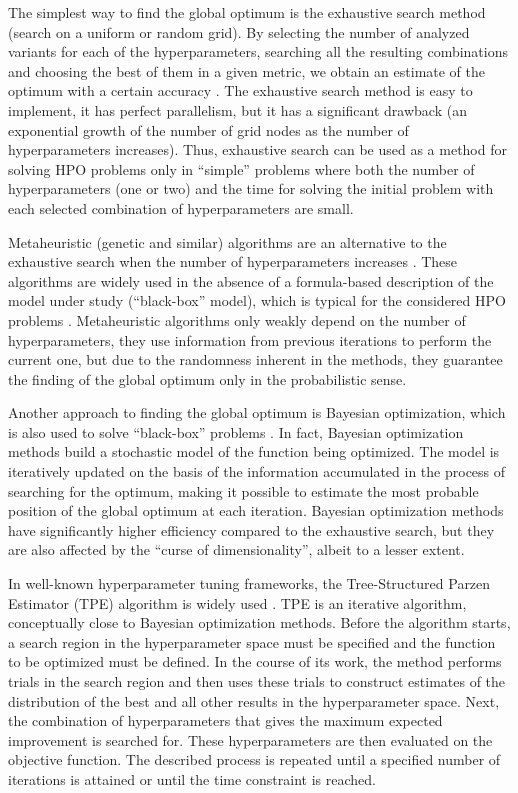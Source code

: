 \documentclass[iicol]{sn-jnl}
\theoremstyle{thmstyleone}%
\theoremstyle{thmstyletwo}%
\theoremstyle{thmstylethree}%
\begin{document}
The simplest way to find the global optimum is the exhaustive search method (search on a uniform \citep{Bao2006} or random \citep{Bergstra2012} grid). 
By selecting the number of analyzed variants for each of the hyperparameters, searching all the resulting combinations and choosing the best of them in a given metric, we obtain an estimate of the optimum with a certain accuracy \citep{Nevendra2022}. The exhaustive search method is easy to implement, it has perfect parallelism, but it has a significant drawback (an exponential growth of the number of grid nodes as the number of hyperparameters increases). Thus, exhaustive search can be used as a method for solving HPO problems only in ``simple'' problems where both the number of hyperparameters (one or two) and the time for solving the initial problem with each selected combination of hyperparameters are small. 

Metaheuristic (genetic and similar) algorithms are an alternative to the exhaustive search when the number of hyperparameters increases \citep{Opara2019}. These algorithms are widely used in the absence of a formula-based description of the model under study (``black-box'' model), which is typical for the considered HPO problems \citep{Zhou2021,Yang2022}. Metaheuristic algorithms only weakly depend on the number of hyperparameters, they use information from previous iterations to perform the current one, but due to the randomness inherent in the methods, they guarantee the finding of the global optimum only in the probabilistic sense.

Another approach to finding the global optimum is Bayesian optimization, which is also used to solve ``black-box'' problems \citep{Frazier2018,Archetti2019}. In fact, Bayesian optimization methods build a stochastic model of the function being optimized. The model is iteratively updated on the basis of the information accumulated in the process of searching for the optimum, making it possible to estimate the most probable position of the global optimum at each iteration. Bayesian optimization methods have significantly higher efficiency compared to the exhaustive search, but they are also affected by the ``curse of dimensionality'', albeit to a lesser extent. 

In well-known hyperparameter tuning frameworks, the Tree-Structured Parzen Estimator (TPE) algorithm is widely used \citep{hyperopt,NIPS2011}. TPE is an iterative algorithm, conceptually close to Bayesian optimization methods. Before the algorithm starts, a search region in the hyperparameter space must be specified and the function to be optimized must be defined. In the course of its work, the method performs trials in the search region and then uses these trials to construct estimates of the distribution of the best and all other results in the hyperparameter space. Next, the combination of hyperparameters that gives the maximum expected improvement is searched for. These hyperparameters are then evaluated on the objective function. The described process is repeated until a specified number of iterations is attained or until the time constraint is reached.  
\end{document}
